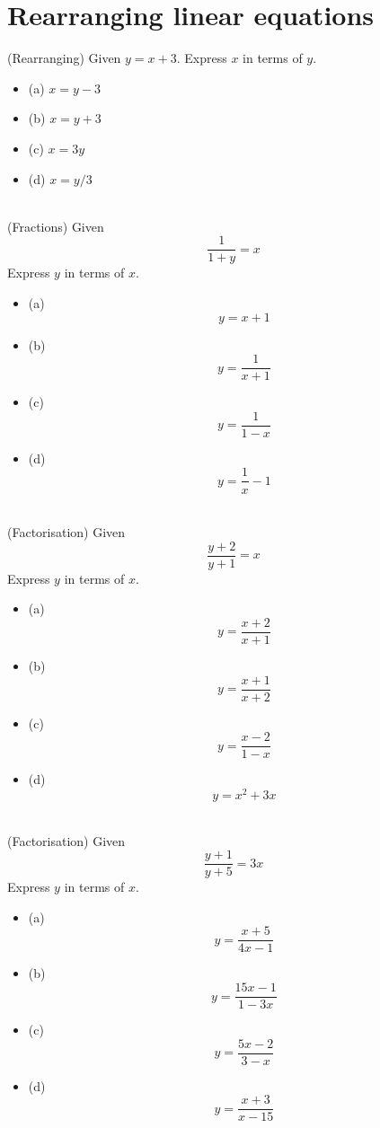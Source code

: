 \documentclass{article}
\begin{document}
\section{Rearranging linear equations}
(Rearranging)
Given $y=x+3$. Express $x$ in terms of $y$.
\begin{itemize}
\item[](a) $x=y-3$
\item[](b) $x=y+3$
\item[](c) $x=3y$
\item[](d) $x=y/3$
\end{itemize} \hrulefill \\[10pt]
(Fractions) Given $$\frac{1}{1+y} = x$$ Express $y$ in terms of $x$.
\begin{itemize}
\item[](a) $$y = x+1$$
\item[](b) $$y = \frac{1}{x+1}$$
\item[](c) $$y = \frac{1}{1-x}$$
\item[](d) $$y = \frac{1}{x} - 1$$
\end{itemize} \hrulefill \\[10pt]
(Factorisation) Given $$\frac{y+2}{y+1} = x$$ Express $y$ in terms of $x$.
\begin{itemize}
\item[](a) $$y = \frac{x+2}{x+1}$$
\item[](b) $$y = \frac{x+1}{x+2}$$
\item[](c) $$y = \frac{x-2}{1-x}$$
\item[](d) $$y = x^2 + 3x$$
\end{itemize} \hrulefill \\[10pt]
(Factorisation) Given $$\frac{y+1}{y+5} = 3x$$ Express $y$ in terms of $x$.
\begin{itemize}
\item[](a) $$y = \frac{x+5}{4x-1}$$
\item[](b) $$y = \frac{15x-1}{1-3x}$$
\item[](c) $$y = \frac{5x-2}{3-x}$$
\item[](d) $$y = \frac{x+3}{x-15}$$
\end{itemize} \hrulefill \\[10pt]
\end{document}
